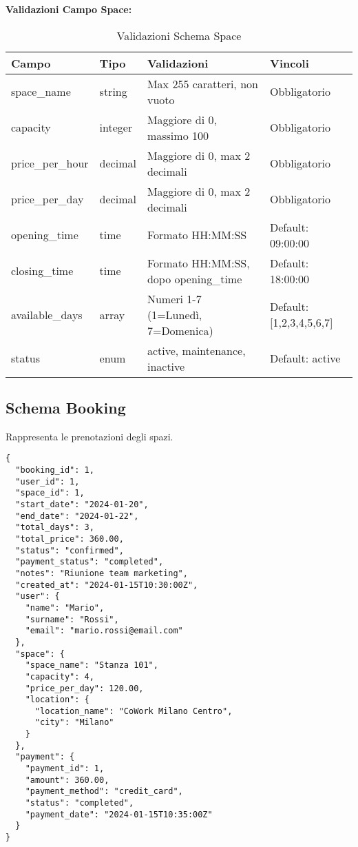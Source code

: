 \textbf{Validazioni Campo Space:}
\begin{table}[H]
\centering
\scriptsize
\begin{tabular}{@{}lp{3cm}p{6cm}p{3cm}@{}}
\toprule
\textbf{Campo} & \textbf{Tipo} & \textbf{Validazioni} & \textbf{Vincoli} \\
\midrule
space\_name & string & Max 255 caratteri, non vuoto & Obbligatorio \\
capacity & integer & Maggiore di 0, massimo 100 & Obbligatorio \\
price\_per\_hour & decimal & Maggiore di 0, max 2 decimali & Obbligatorio \\
price\_per\_day & decimal & Maggiore di 0, max 2 decimali & Obbligatorio \\
opening\_time & time & Formato HH:MM:SS & Default: 09:00:00 \\
closing\_time & time & Formato HH:MM:SS, dopo opening\_time & Default: 18:00:00 \\
available\_days & array & Numeri 1-7 (1=Lunedì, 7=Domenica) & Default: [1,2,3,4,5,6,7] \\
status & enum & active, maintenance, inactive & Default: active \\
\bottomrule
\end{tabular}
\caption{Validazioni Schema Space}
\end{table}

\subsection{Schema Booking}
Rappresenta le prenotazioni degli spazi.

\begin{lstlisting}[caption=Schema Booking Completo]
{
  "booking_id": 1,
  "user_id": 1,
  "space_id": 1,
  "start_date": "2024-01-20",
  "end_date": "2024-01-22",
  "total_days": 3,
  "total_price": 360.00,
  "status": "confirmed",
  "payment_status": "completed",
  "notes": "Riunione team marketing",
  "created_at": "2024-01-15T10:30:00Z",
  "user": {
    "name": "Mario",
    "surname": "Rossi",
    "email": "mario.rossi@email.com"
  },
  "space": {
    "space_name": "Stanza 101",
    "capacity": 4,
    "price_per_day": 120.00,
    "location": {
      "location_name": "CoWork Milano Centro",
      "city": "Milano"
    }
  },
  "payment": {
    "payment_id": 1,
    "amount": 360.00,
    "payment_method": "credit_card",
    "status": "completed",
    "payment_date": "2024-01-15T10:35:00Z"
  }
}
\end{lstlisting}

